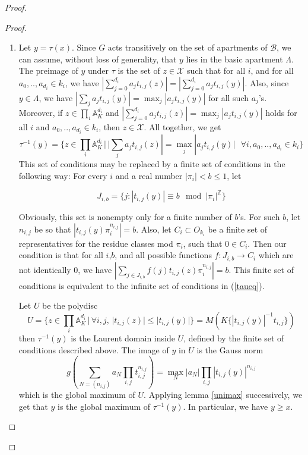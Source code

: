 \documentclass{amsart}
\theoremstyle{theorem}
\theoremstyle{lemma}
\theoremstyle{prop}
\theoremstyle{definition}
\theoremstyle{corollary}
\theoremstyle{remark}
\newcommand{\A}{\mathbb{A}}
\newcommand{\Z}{\mathbb{Z}}
\newcommand{\B}{\mathcal{B}}
\newcommand{\X}{\mathcal{X}}
\begin{document}
\begin{proof}
\begin{proof}
\begin{enumerate}
\item
Let  $y=\tau(x)$. Since $G$ acts transitively on the set of apartments of $\B$, we can assume, without loss of generality, that $y$ lies in the basic apartment $\Lambda$. The preimage of $y$ under $\tau$ is the set of $z\in \X$ such that for all $i$, and for all $a_0,..,a_{d_i}\in k_i$, we have $|\sum_{j=0}^{d_i} a_j t_{i,j}(z)|=|\sum_{j=0}^{d_i} a_j t_{i,j}(y)|$. Also, since $y\in \Lambda$, we have $|\sum_j a_j t_{i,j}(y)|=\max_j |a_j t_{i,j}(y)|$ for all such $a_j$'s. Moreover, if $z \in \prod_i  \A^{d_i}_K$ and $|\sum_{j=0}^{d_i} a_j t_{i,j}(z)|=\max_j |a_j t_{i,j}(y)|$ holds for all $i$ and $a_0,..,a_{d_i}\in k_i$, then $z \in \X$. All together, we get 
\begin{equation}
\label{taueq}
\tau^{-1}(y)= \{z \in \prod_i  \A^{d_i}_K \, | \, |\sum_j a_j t_{i,j}(z)|=\max_j |a_j t_{i,j}(y)| \text{ } \forall i,  a_0,..,a_{d_i}\in k_i\}
\end{equation}
This set of conditions may be replaced by a finite set of conditions in the following way: For every $i$ and a real number $|\pi_i| < b \leq 1$, let 

$$J_{i,b}= \{j : |t_{i,j}(y)| \equiv b \mod |\pi_i|^{\Z} \}$$

Obviously, this set is nonempty only for a finite number of $b$'s. For such $b$, let $n_{i,j}$ be so that $|t_{i,j}(y) \pi_i^{n_{i,j}}| = b$. Also, let $C_i\subset O_{k_i}$ be a finite set of representatives for the residue classes mod $\pi_i$, such that $0\in C_i$. Then our condition is that for all $i$,$b$, and all possible functions $f:J_{i,b} \rightarrow C_i$ which are not identically 0, we have $|\sum_{j\in J_{i,b}} f(j) t_{i,j}(z) \pi_i^{n_{i,j}}|=b$. This finite set of conditions is equivalent to the infinite set of conditions in (\ref{taueq}).

Let $U$ be the polydisc
$$ U=\{z \in \prod_i \A^{d_i}_K \, | \, \forall i,j,\,|t_{i,j}(z)| \leq |t_{i,j}(y)| \} = M(K\{|t_{i,j}(y)|^{-1}t_{i,j}\}) $$
then $\tau^{-1}(y)$ is the Laurent domain inside $U$, defined by the finite set of conditions described above. 
The image of $y$ in $U$ is the Gauss norm $$g(\sum_{N=(n_{i,j})} a_N \prod_{i,j} t_{i,j}^{n_{i,j}})= \max_N |a_N| \prod_{i,j} |t_{i,j}(y)|^{n_{i,j}}$$ which is the global maximum of $U$. Applying lemma \ref{unimax} successively, we get that $y$ is the global maximum of $\tau^{-1}(y)$. In particular, we have $y \geq x$.


\end{enumerate}
\end{proof}
\end{proof}
\end{document}
